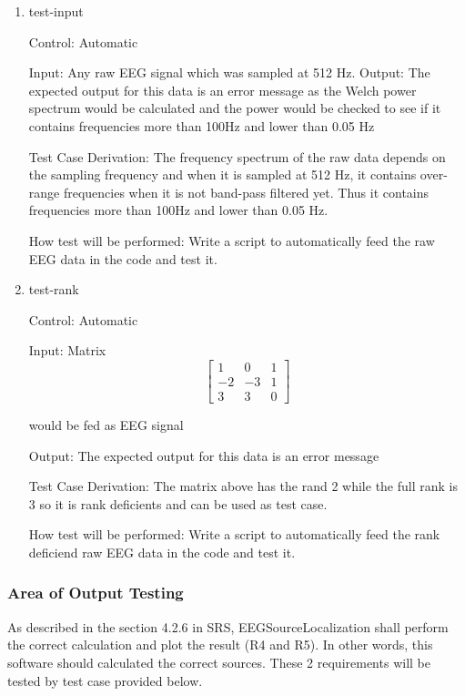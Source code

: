 \documentclass[12pt, titlepage]{article}
\renewcommand{\progname}{EEGSourceLocalization}
\begin{document}
\begin{enumerate}

\item{test-input\\}

Control: Automatic
					
Input: Any raw EEG signal which was sampled at 512 Hz.					
Output: The expected output for this data is an error message as the Welch power spectrum would be calculated and the power would be checked to see if it contains frequencies more than 100Hz and lower than 0.05 Hz

Test Case Derivation:  The frequency spectrum of the raw data depends on the sampling frequency and when it is sampled at 512 Hz, it contains over-range frequencies when it is not band-pass filtered yet. Thus it contains frequencies more than 100Hz and lower than 0.05 Hz.

					
How test will be performed: Write a script to automatically feed the raw EEG data in the code and test it.
					
\item{test-rank\\}

Control: Automatic
					
Input: Matrix 
\[
\begin{bmatrix}
1 & 0 & 1\\
-2 & -3 & 1\\
3 & 3 & 0
\end{bmatrix} 
\]

would be fed as EEG signal
					
Output: The expected output for this data is an error message 

Test Case Derivation: The matrix above has the rand 2 while the full rank is 3 so it is rank deficients and can be used as test case.

How test will be performed: Write a script to automatically feed the rank deficiend raw EEG data in the code and test it.

\end{enumerate}



\subsubsection{Area of Output Testing}

As described in the section 4.2.6 in SRS, \progname{}  shall perform the correct calculation and plot the result (R4 and R5). In other words, this software should calculated the correct sources. These 2 requirements will be tested by test case provided below.\\
\end{document}

